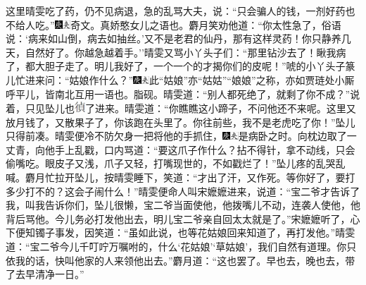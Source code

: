 这里晴雯吃了药，仍不见病退，急的乱骂大夫，说：``只会骗人的钱，一剂好药也不给人吃。''{\includegraphics[width=3mm]{../Images/00004}\includegraphics[width=3mm]{../Images/00012}\footnotesize \kaishu 奇文。真娇憨女儿之语也。}麝月笑劝他道：``你太性急了，俗语说：`病来如山倒，病去如抽丝。'又不是老君的仙丹，那有这样灵药！你只静养几天，自然好了。你越急越着手。''晴雯又骂小丫头子们：``那里钻沙去了！瞅我病了，都大胆子走了。明儿我好了，一个一个的才揭你们的皮呢！''唬的小丫头子篆儿忙进来问：``姑娘作什么？''{\includegraphics[width=3mm]{../Images/00004}\includegraphics[width=3mm]{../Images/00012}\footnotesize \kaishu 此``姑娘''亦``姑姑''``娘娘''之称，亦如贾琏处小厮呼平儿，皆南北互用一语也。脂砚。}晴雯道：``别人都死绝了，就剩了你不成？''说着，只见坠儿也\includegraphics[width=4mm]{../images/00015}了进来。晴雯道：``你瞧瞧这小蹄子，不问他还不来呢。这里又放月钱了，又散果子了，你该跑在头里了。你往前些，我不是老虎吃了你！''坠儿只得前凑。晴雯便冷不防欠身一把将他的手抓住，{\includegraphics[width=3mm]{../Images/00004}\includegraphics[width=3mm]{../Images/00012}\footnotesize \kaishu 是病卧之时。}向枕边取了一丈青，向他手上乱戳，口内骂道：``要这爪子作什么？拈不得针，拿不动线，只会偷嘴吃。眼皮子又浅，爪子又轻，打嘴现世的，不如戳烂了！''坠儿疼的乱哭乱喊。麝月忙拉开坠儿，按晴雯睡下，笑道：``才出了汗，又作死。等你好了，要打多少打不的？这会子闹什么！''晴雯便命人叫宋嬷嬷进来，说道：``宝二爷才告诉了我，叫我告诉你们，坠儿很懒，宝二爷当面使他，他拨嘴儿不动，连袭人使他，他背后骂他。今儿务必打发他出去，明儿宝二爷亲自回太太就是了。''宋嬷嬷听了，心下便知镯子事发，因笑道：``虽如此说，也等花姑娘回来知道了，再打发他。''晴雯道：``宝二爷今儿千叮咛万嘱咐的，什么`花姑娘'`草姑娘'，我们自然有道理。你只依我的话，快叫他家的人来领他出去。''麝月道：``这也罢了。早也去，晚也去，带了去早清净一日。''

